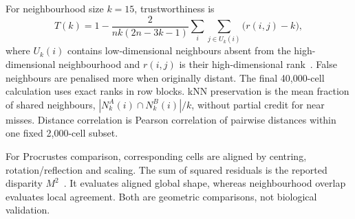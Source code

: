 \documentclass[11pt,a4paper]{article}
\begin{document}
For neighbourhood size $k=15$, trustworthiness is
\[
T(k)=1-\frac{2}{nk(2n-3k-1)}\sum_i\sum_{j\in U_k(i)}\bigl(r(i,j)-k\bigr),
\]
where $U_k(i)$ contains low-dimensional neighbours absent from the high-dimensional neighbourhood and $r(i,j)$ is their high-dimensional rank~\cite{trust}. False neighbours are penalised more when originally distant. The final 40,000-cell calculation uses exact ranks in row blocks. kNN preservation is the mean fraction of shared neighbours, $|N_k^A(i)\cap N_k^B(i)|/k$, without partial credit for near misses. Distance correlation is Pearson correlation of pairwise distances within one fixed 2,000-cell subset.

For Procrustes comparison, corresponding cells are aligned by centring, rotation/reflection and scaling. The sum of squared residuals is the reported disparity $M^2$~\cite{scipy}. It evaluates aligned global shape, whereas neighbourhood overlap evaluates local agreement. Both are geometric comparisons, not biological validation.

\begin{table}[htb]\centering\small

\caption{The complete t-SNE sweep. Perplexity 70 wins by trustworthiness, whereas perplexity 30 has slightly higher exact-neighbour overlap. Parameter selection therefore depends on the declared criterion.}
\label{tab:tsnesweep}
\end{table}

\begin{table}[htb]\centering\small

\caption{UMAP learning-rate selection: mean trustworthiness of the two fixed configurations $(n,d)=(5,0)$ and $(50,0.1)$. Learning rate 0.1 wins this mean. Selection does not use the best single configuration across all rates.}
\end{table}
\end{document}
